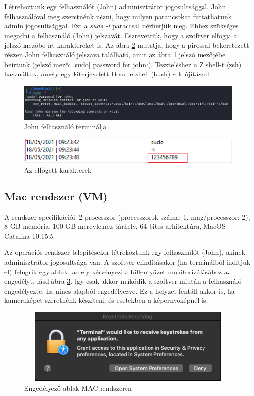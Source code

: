 \documentclass[12pt,a4paper,oneside]{report}
\begin{document}
Létrehoztunk egy felhasználót (John) adminisztrátor jogosultsággal. John felhasználóval meg szeretnénk nézni, hogy milyen parancsokat futtathatunk admin jogosultsággal. Ezt a \textit{sudo -l} paraccsal nézhetjük meg.  Ehhez szükséges megadni a felhasználó (John) jelszavát. Észrevettük, hogy a szoftver elfogja a jelszó mezőbe írt karaktereket is.  Az ábra \ref{fig:linuxVM1} mutatja, hogy a pirossal bekeretezett részen John felhasználó jelszava található, amit az ábra \ref{fig:linuxVM2} jelszó mezőjébe beírtunk (jelszó mező: [sudo] password for john:). Teszteléshez a Z shell-t (zsh) használtuk, amely egy kiterjesztett Bourne shell (bash) sok újítással.
\begin{figure}[H]
\centering
\includegraphics[width=450pt]{../images/linuxVM2}
\caption{John felhasználó terminálja}
\label{fig:linuxVM2}
\end{figure}
\begin{figure}[H]
\centering
\includegraphics[width=400pt]{../images/linuxVM1}
\caption{Az elfogott karakterek}
\label{fig:linuxVM1}
\end{figure}

\subsection{Mac rendszer (VM)}
A rendszer specifikációi: 2 processzor (processzorok száma: 1, mag/processzor: 2), 8 GB memória, 100 GB merevlemez tárhely, 64 bites arhitektúra, MacOS Catalina 10.15.5.

Az operációs rendszer telepítésekor létrehoztunk egy felhasználót (John), akinek adminisztrátor jogosultsága van. A szoftver elindításakor (ha terminálból indítjuk el) felugrik egy ablak, amely kérvényezi a billentyűzet monitorizálásához az engedélyt, lásd ábra \ref{fig:macVM1}. Így csak akkor működik a szoftver miután a felhasználó engedélyezte, ha nincs alapból engedélyezve. Ez a helyzet fentáll akkor is, ha kameraképet szeretnénk készíteni, és esetekben a képernyőképnél is.
\begin{figure}[H]
\centering
\includegraphics[width=450pt, height=105pt]{../images/macVM1}
\caption{Engedélyező ablak MAC rendszeren}
\label{fig:macVM1}
\end{figure}
\end{document}
